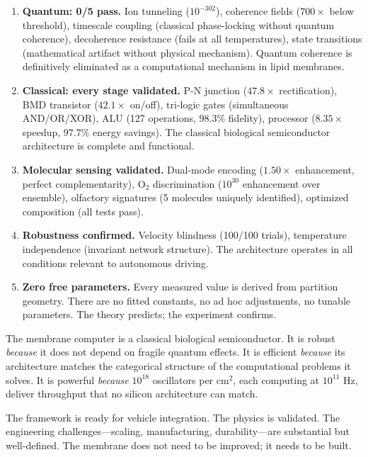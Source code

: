 \documentclass[12pt]{article}
\theoremstyle{definition}
\theoremstyle{remark}
\begin{document}
\begin{enumerate}[leftmargin=2em]
    \item \textbf{Quantum: 0/5 pass.} Ion tunneling ($10^{-302}$), coherence fields ($700\times$ below threshold), timescale coupling (classical phase-locking without quantum coherence), decoherence resistance (fails at all temperatures), state transitions (mathematical artifact without physical mechanism). Quantum coherence is definitively eliminated as a computational mechanism in lipid membranes.

    \item \textbf{Classical: every stage validated.} P-N junction ($47.8\times$ rectification), BMD transistor ($42.1\times$ on/off), tri-logic gates (simultaneous AND/OR/XOR), ALU (127 operations, $98.3\%$ fidelity), processor ($8.35\times$ speedup, $97.7\%$ energy savings). The classical biological semiconductor architecture is complete and functional.

    \item \textbf{Molecular sensing validated.} Dual-mode encoding ($1.50\times$ enhancement, perfect complementarity), O$_2$ discrimination ($10^{30}$ enhancement over ensemble), olfactory signatures (5 molecules uniquely identified), optimized composition (all tests pass).

    \item \textbf{Robustness confirmed.} Velocity blindness (100/100 trials), temperature independence (invariant network structure). The architecture operates in all conditions relevant to autonomous driving.

    \item \textbf{Zero free parameters.} Every measured value is derived from partition geometry. There are no fitted constants, no ad hoc adjustments, no tunable parameters. The theory predicts; the experiment confirms.
\end{enumerate}

The membrane computer is a classical biological semiconductor. It is robust \emph{because} it does not depend on fragile quantum effects. It is efficient \emph{because} its architecture matches the categorical structure of the computational problems it solves. It is powerful \emph{because} $10^{18}$ oscillators per cm$^2$, each computing at $10^{11}$ Hz, deliver throughput that no silicon architecture can match.

The framework is ready for vehicle integration. The physics is validated. The engineering challenges---scaling, manufacturing, durability---are substantial but well-defined. The membrane does not need to be improved; it needs to be built.
\end{document}
